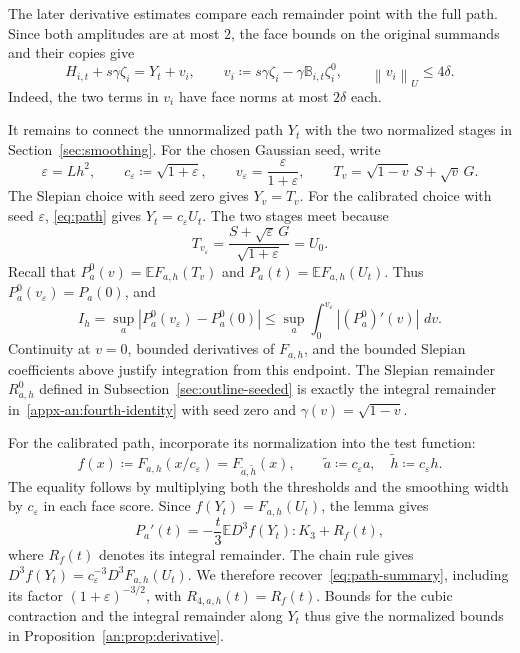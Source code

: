 \documentclass[11pt,letterpaper]{article}
\theoremstyle{remark}
\newcommand{\E}{\mathbb E}
\newcommand{\norm}[1]{\left\lVert#1\right\rVert}
\newcommand{\dd}{\,d}
\begin{document}
The later derivative estimates compare each remainder point with
the full path. Since both amplitudes are at most \(2\), the face
bounds on the original summands and their copies give
\begin{equation}
 H_{i,t}+s\gamma\zeta_i=Y_t+v_i,\qquad
 v_i\coloneqq s\gamma\zeta_i-\gamma\mathbb B_{i,t}\zeta_i^0,
 \qquad \norm{v_i}_U\le4\delta.
 \label{appx-an:translates}
\end{equation}
Indeed, the two terms in \(v_i\) have face norms at most
\(2\delta\) each.

It remains to connect the unnormalized path \(Y_t\) with the two
normalized stages in Section~\ref{sec:smoothing}. For the chosen
Gaussian seed, write
\begin{equation}
 \varepsilon=Lh^2,\qquad
 c_\varepsilon\coloneqq\sqrt{1+\varepsilon},\qquad
 v_\varepsilon=\frac{\varepsilon}{1+\varepsilon},
 \qquad T_v=\sqrt{1-v}\,S+\sqrt v\,G.
 \label{eq:seed-initialization}
\end{equation}
The Slepian choice with seed zero gives \(Y_v=T_v\). For the
calibrated choice with seed \(\varepsilon\),
\eqref{eq:path} gives \(Y_t=c_\varepsilon U_t\). The two stages
meet because
\[
 T_{v_\varepsilon}
 =\frac{S+\sqrt\varepsilon\,G}{\sqrt{1+\varepsilon}}
 =U_0.
\]
Recall that \(P_a^0(v)=\E F_{a,h}(T_v)\) and
\(P_a(t)=\E F_{a,h}(U_t)\). Thus
\(P_a^0(v_\varepsilon)=P_a(0)\), and
\[
 I_h=\sup_a|P_a^0(v_\varepsilon)-P_a^0(0)|
 \le\sup_a\int_0^{v_\varepsilon}|(P_a^0)'(v)|\,\dd v.
\]
Continuity at \(v=0\), bounded derivatives of \(F_{a,h}\), and the
bounded Slepian coefficients above justify integration from this
endpoint. The Slepian remainder \(R^0_{a,h}\) defined in
Subsection~\ref{sec:outline-seeded} is exactly the integral
remainder in~\eqref{appx-an:fourth-identity} with seed zero and
\(\gamma(v)=\sqrt{1-v}\).

For the calibrated path, incorporate its normalization into the
test function:
\begin{equation}
 f(x)\coloneqq F_{a,h}(x/c_\varepsilon)
       =F_{\widetilde a,\widetilde h}(x),\qquad
 \widetilde a\coloneqq c_\varepsilon a,\quad
 \widetilde h\coloneqq c_\varepsilon h.
 \label{eq:seeded-test}
\end{equation}
The equality follows by multiplying both the thresholds and the
smoothing width by \(c_\varepsilon\) in each face score. Since
\(f(Y_t)=F_{a,h}(U_t)\), the lemma gives
\[
 P_a'(t)=-\frac t3\E D^3f(Y_t):K_3+R_f(t),
\]
where \(R_f(t)\) denotes its integral remainder. The chain rule
gives \(D^3f(Y_t)=c_\varepsilon^{-3}D^3F_{a,h}(U_t)\).
We therefore recover~\eqref{eq:path-summary}, including its
factor \((1+\varepsilon)^{-3/2}\), with
\(R_{4,a,h}(t)=R_f(t)\). Bounds for the cubic contraction and the
integral remainder along \(Y_t\) thus give the normalized bounds
in Proposition~\ref{an:prop:derivative}.
\end{document}
